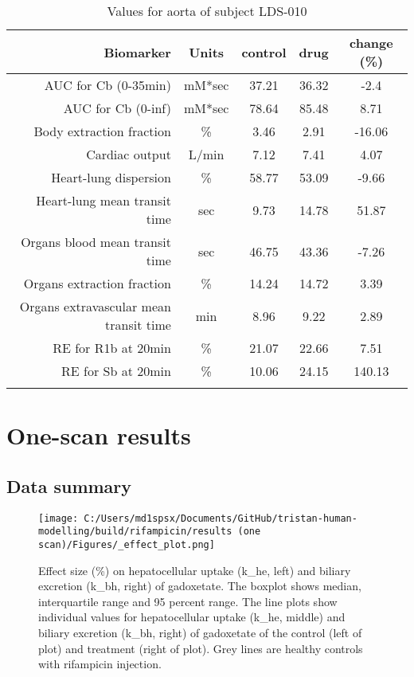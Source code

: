\documentclass{epflreport}%
\begin{document}
\begin{longtable}{rcccc}%
\hline%
Biomarker&Units&control&drug&change (\%)\\%
\hline%
AUC for Cb (0{-}35min)&mM*sec&37.21&36.32&{-}2.4\\%
AUC for Cb (0{-}inf)&mM*sec&78.64&85.48&8.71\\%
Body extraction fraction&\%&3.46&2.91&{-}16.06\\%
Cardiac output&L/min&7.12&7.41&4.07\\%
Heart{-}lung dispersion&\%&58.77&53.09&{-}9.66\\%
Heart{-}lung mean transit time&sec&9.73&14.78&51.87\\%
Organs blood mean transit time&sec&46.75&43.36&{-}7.26\\%
Organs extraction fraction&\%&14.24&14.72&3.39\\%
Organs extravascular mean transit time&min&8.96&9.22&2.89\\%
RE for R1b at 20min&\%&21.07&22.66&7.51\\%
RE for Sb at 20min&\%&10.06&24.15&140.13\\%
\hline%
\caption{Values for aorta of subject LDS-010} \\%
\end{longtable}%
\clearpage%
\chapter{One{-}scan results}%
\section{Data summary}%
\label{sec:Datasummary}%

%


\begin{figure}[h!]%
\centering%
\texttt{[image: C:/Users/md1spsx/Documents/GitHub/tristan-human-modelling/build/rifampicin/results (one scan)/Figures/\_effect\_plot.png]}%
\caption{Effect size (\%) on hepatocellular uptake (k\_he, left) and biliary excretion (k\_bh, right) of gadoxetate. The boxplot shows median, interquartile range and 95 percent range. The line plots show individual values for hepatocellular uptake (k\_he, middle) and biliary excretion (k\_bh, right) of gadoxetate of the control (left of plot) and treatment (right of plot). Grey lines are healthy controls with rifampicin injection.}%
\end{figure}
\end{document}
